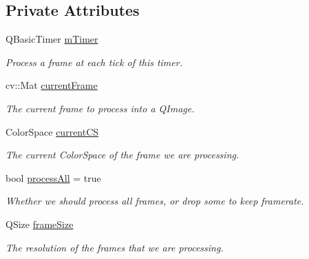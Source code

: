 \subsection*{Private Attributes}
\begin{DoxyCompactItemize}
\item 
Q\+Basic\+Timer \hyperlink{classFrameConverter_aaa171c70ddee27fad24d4414fce944d8}{m\+Timer}\hypertarget{classFrameConverter_aaa171c70ddee27fad24d4414fce944d8}{}\label{classFrameConverter_aaa171c70ddee27fad24d4414fce944d8}

\begin{DoxyCompactList}\small\item\em Process a frame at each tick of this timer. \end{DoxyCompactList}\item 
cv\+::\+Mat \hyperlink{classFrameConverter_ac0798133c92cf81ece25f35a2e60af3d}{current\+Frame}\hypertarget{classFrameConverter_ac0798133c92cf81ece25f35a2e60af3d}{}\label{classFrameConverter_ac0798133c92cf81ece25f35a2e60af3d}

\begin{DoxyCompactList}\small\item\em The current frame to process into a Q\+Image. \end{DoxyCompactList}\item 
Color\+Space \hyperlink{classFrameConverter_a022c0ee128a17a18d53949ce777675e4}{current\+CS}\hypertarget{classFrameConverter_a022c0ee128a17a18d53949ce777675e4}{}\label{classFrameConverter_a022c0ee128a17a18d53949ce777675e4}

\begin{DoxyCompactList}\small\item\em The current Color\+Space of the frame we are processing. \end{DoxyCompactList}\item 
bool \hyperlink{classFrameConverter_aa801f185eda944a3c942f1578d491e08}{process\+All} = true\hypertarget{classFrameConverter_aa801f185eda944a3c942f1578d491e08}{}\label{classFrameConverter_aa801f185eda944a3c942f1578d491e08}

\begin{DoxyCompactList}\small\item\em Whether we should process all frames, or drop some to keep framerate. \end{DoxyCompactList}\item 
Q\+Size \hyperlink{classFrameConverter_a061df5cf24591bdcfbdaa2dd74e993d7}{frame\+Size}\hypertarget{classFrameConverter_a061df5cf24591bdcfbdaa2dd74e993d7}{}\label{classFrameConverter_a061df5cf24591bdcfbdaa2dd74e993d7}

\begin{DoxyCompactList}\small\item\em The resolution of the frames that we are processing. \end{DoxyCompactList}\end{DoxyCompactItemize}


